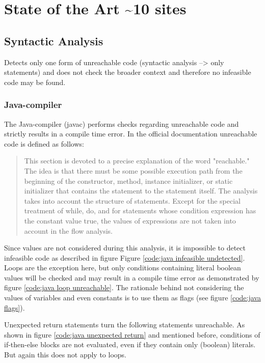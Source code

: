 
\chapter{State of the Art \textasciitilde 10 sites}
\label{cha:state of the art}


\section{Syntactic Analysis}

Detects only one form of unreachable code (syntactic analysis --> only statements) and does not check the broader context and therefore no infeasible code may be found.

\subsection{Java-compiler}
\label{sec:java compiler}

The Java-compiler (javac) performs checks regarding unreachable code and strictly results in a compile time error. 
In the official documentation \cite{Chapter14Blocks} unreachable code is defined as follows:
\begin{quote}
\label{quote:java unreachable definition}
This section is devoted to a precise explanation of the word "reachable." 
The idea is that there must be some possible execution path from the beginning of the constructor, method, instance initializer, or static initializer that contains the statement to the statement itself. The analysis takes into account the structure of statements. Except for the special treatment of while, do, and for statements whose condition expression has the constant value true, the values of expressions are not taken into account in the flow analysis.
\end{quote}

Since values are not considered during this analysis, it is impossible to detect infeasible code as described in figure Figure \ref{code:java infeasible undetected}.
 Loops are the exception here, but only conditions containing literal boolean values will be checked and may result in a compile time error as demonstrated by figure \ref{code:java loop unreachable}. The rationale behind not considering the values of variables and even constants is to use them as flags (see figure \ref{code:java flags}).


Unexpected return statements turn the following statements unreachable. As shown in figure \ref{code:java unexpected return} and mentioned before, conditions of if-then-else blocks are not evaluated, even if they contain only (boolean) literals. But again this does not apply to loops.


